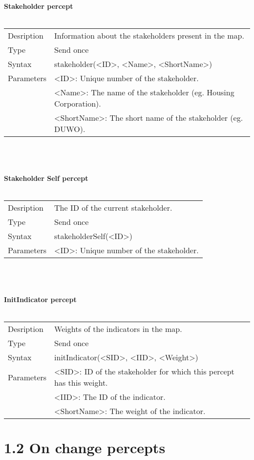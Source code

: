 \documentclass[english,11pt]{report}
\begin{document}
\textbf{Stakeholder percept}\\
\\
\begin{tabularx}{\textwidth}{lX}
 Desription & Information about the stakeholders present in the map. \\
 Type & Send once \\
 Syntax & stakeholder(<ID>, <Name>, <ShortName>) \\
 Parameters &   <ID>: Unique number of the stakeholder.\\
            &   <Name>: The name of the stakeholder (eg. Housing Corporation).\\
            &   <ShortName>: The short name of the stakeholder (eg. DUWO).
\end{tabularx}\\
\\
\\
\textbf{Stakeholder Self percept}\\
\\
\begin{tabularx}{\textwidth}{lX}
 Desription & The ID of the current stakeholder. \\
 Type & Send once \\
 Syntax & stakeholderSelf(<ID>) \\
 Parameters &   <ID>: Unique number of the stakeholder.
\end{tabularx}\\
\\
\\
\textbf{InitIndicator percept}\\
\\
\begin{tabularx}{\textwidth}{lX}
 Desription & Weights of the indicators in the map. \\
 Type & Send once \\
 Syntax & initIndicator(<SID>, <IID>, <Weight>) \\
 Parameters &   <SID>: ID of the stakeholder for which this percept has this weight.\\
            &   <IID>: The ID of the indicator.\\
            &   <ShortName>: The weight of the indicator.
\end{tabularx}

\newpage
\section*{1.2 On change percepts}
\end{document}
